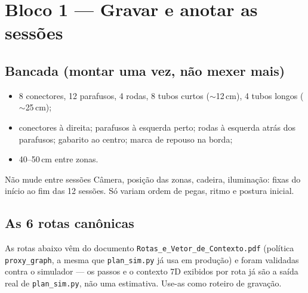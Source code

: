 \documentclass[11pt,a4paper]{article}
\begin{document}
\section{Bloco 1 --- Gravar e anotar as sessões}
\label{sec:dataset}

\subsection{Bancada (montar uma vez, não mexer mais)}

\begin{itemize}
  \item 8 conectores, 12 parafusos, 4 rodas, 8 tubos curtos ($\sim$12\,cm), 4 tubos longos ($\sim$25\,cm);
  \item conectores à direita; parafusos à esquerda perto; rodas à esquerda atrás dos parafusos; gabarito ao centro; marca de repouso na borda;
  \item 40--50\,cm entre zonas.
\end{itemize}

\begin{warningbox}{Não mude entre sessões}
Câmera, posição das zonas, cadeira, iluminação: fixas do início ao fim das
12 sessões. Só variam ordem de pegas, ritmo e postura inicial.
\end{warningbox}

\subsection{As 6 rotas canônicas}
\label{sec:rotas-canonicas}

As rotas abaixo vêm do documento \texttt{Rotas\_e\_Vetor\_de\_Contexto.pdf}
(política \texttt{proxy\_graph}, a mesma que \texttt{plan\_sim.py} já usa em
produção) e foram validadas contra o simulador --- os passos e o contexto
7D exibidos por rota já são a saída real de \texttt{plan\_sim.py}, não uma
estimativa. Use-as como roteiro de gravação.
\end{document}
